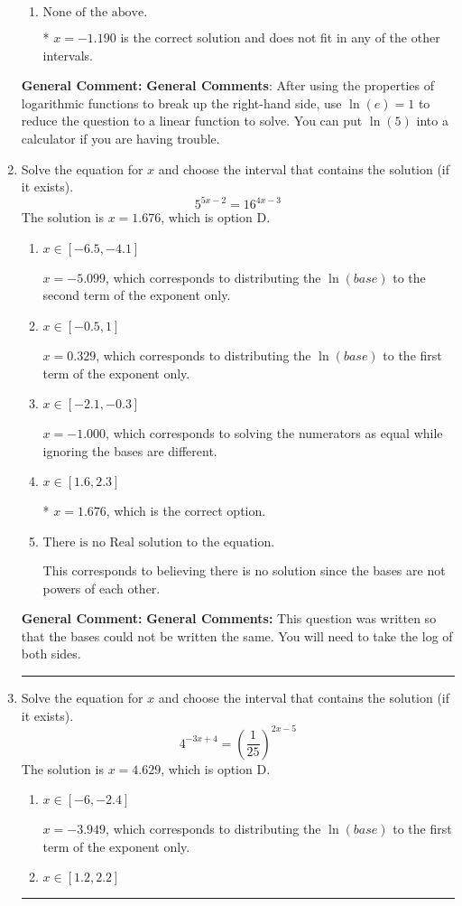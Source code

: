 \documentclass{extbook}[14pt]
\newcommand{\litem}[1]{\item #1

\rule{\textwidth}{0.4pt}}
\begin{document}
\begin{enumerate}
{\begin{enumerate}[label=\Alph*.]
This corresponds to believing you cannot solve the equation.
\item \( \text{None of the above.} \)

* $x = -1.190$ is the correct solution and does not fit in any of the other intervals.
\end{enumerate}

\textbf{General Comment:} \textbf{General Comments}: After using the properties of logarithmic functions to break up the right-hand side, use $\ln(e) = 1$ to reduce the question to a linear function to solve. You can put $\ln(5)$ into a calculator if you are having trouble.
}
\litem{
Solve the equation for $x$ and choose the interval that contains the solution (if it exists).
\[ 5^{5x-2} = 16^{4x-3} \]The solution is \( x = 1.676 \), which is option D.\begin{enumerate}[label=\Alph*.]
\item \( x \in [-6.5, -4.1] \)

$x = -5.099$, which corresponds to distributing the $\ln(base)$ to the second term of the exponent only.
\item \( x \in [-0.5, 1] \)

$x = 0.329$, which corresponds to distributing the $\ln(base)$ to the first term of the exponent only.
\item \( x \in [-2.1, -0.3] \)

$x = -1.000$, which corresponds to solving the numerators as equal while ignoring the bases are different.
\item \( x \in [1.6, 2.3] \)

* $x = 1.676$, which is the correct option.
\item \( \text{There is no Real solution to the equation.} \)

This corresponds to believing there is no solution since the bases are not powers of each other.
\end{enumerate}

\textbf{General Comment:} \textbf{General Comments:} This question was written so that the bases could not be written the same. You will need to take the log of both sides.
}
\litem{
Solve the equation for $x$ and choose the interval that contains the solution (if it exists).
\[ 4^{-3x+4} = \left(\frac{1}{25}\right)^{2x-5} \]The solution is \( x = 4.629 \), which is option D.\begin{enumerate}[label=\Alph*.]
\item \( x \in [-6, -2.4] \)

$x = -3.949$, which corresponds to distributing the $\ln(base)$ to the first term of the exponent only.
\item \( x \in [1.2, 2.2] \)


\end{enumerate}}
\end{enumerate}
\end{document}
